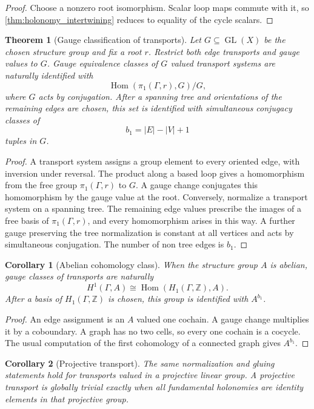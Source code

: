 \documentclass[11pt,a4paper]{article}
\newtheorem{theorem}{Theorem}[section]
\theoremstyle{plain}
\newtheorem{corollary}[corollary]{Corollary}
\theoremstyle{definition}
\theoremstyle{remark}
\newcommand{\Hom}{\operatorname{Hom}}
\begin{document}
\begin{proof}
Choose a nonzero root isomorphism.  Scalar loop maps commute with it, so \cref{thm:holonomy_intertwining} reduces to equality of the cycle scalars.
\end{proof}

\begin{theorem}[Gauge classification of transports]\label{thm:gauge_classification}
Let $G\subseteq\operatorname{GL}(X)$ be the chosen structure group and fix a root $r$.  Restrict both edge transports and gauge values to $G$.  Gauge equivalence classes of $G$ valued transport systems are naturally identified with
\[
\Hom(\pi_1(\Gamma,r),G)/G,
\]
where $G$ acts by conjugation.  After a spanning tree and orientations of the remaining edges are chosen, this set is identified with simultaneous conjugacy classes of
\[
b_1=|E|-|V|+1
\]
tuples in $G$.
\end{theorem}

\begin{proof}
A transport system assigns a group element to every oriented edge, with inversion under reversal.  The product along a based loop gives a homomorphism from the free group $\pi_1(\Gamma,r)$ to $G$.  A gauge change conjugates this homomorphism by the gauge value at the root.  Conversely, normalize a transport system on a spanning tree.  The remaining edge values prescribe the images of a free basis of $\pi_1(\Gamma,r)$, and every homomorphism arises in this way.  A further gauge preserving the tree normalization is constant at all vertices and acts by simultaneous conjugation.  The number of non tree edges is $b_1$.
\end{proof}

\begin{corollary}[Abelian cohomology class]\label{cor:abelian_holonomy_class}
When the structure group $A$ is abelian, gauge classes of transports are naturally
\[
H^1(\Gamma,A)
\cong
\Hom(H_1(\Gamma,\mathbb Z),A).
\]
After a basis of $H_1(\Gamma,\mathbb Z)$ is chosen, this group is identified with $A^{b_1}$.
\end{corollary}

\begin{proof}
An edge assignment is an $A$ valued one cochain.  A gauge change multiplies it by a coboundary.  A graph has no two cells, so every one cochain is a cocycle.  The usual computation of the first cohomology of a connected graph gives $A^{b_1}$.
\end{proof}

\begin{corollary}[Projective transport]\label{cor:projective_transport}
The same normalization and gluing statements hold for transports valued in a projective linear group.  A projective transport is globally trivial exactly when all fundamental holonomies are identity elements in that projective group.
\end{corollary}
\end{document}

